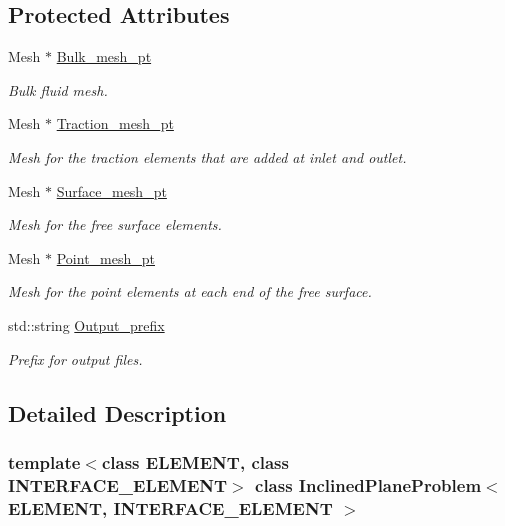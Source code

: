 \subsection*{Protected Attributes}
\begin{DoxyCompactItemize}
\item 
Mesh $\ast$ \hyperlink{classInclinedPlaneProblem_a20c506fe684dc146424b8ec019239783}{Bulk\+\_\+mesh\+\_\+pt}
\begin{DoxyCompactList}\small\item\em Bulk fluid mesh. \end{DoxyCompactList}\item 
Mesh $\ast$ \hyperlink{classInclinedPlaneProblem_a85bcc36a8ad4ad7aa3595585e73a3197}{Traction\+\_\+mesh\+\_\+pt}
\begin{DoxyCompactList}\small\item\em Mesh for the traction elements that are added at inlet and outlet. \end{DoxyCompactList}\item 
Mesh $\ast$ \hyperlink{classInclinedPlaneProblem_aba36d367278218bf00356c3bee0733a0}{Surface\+\_\+mesh\+\_\+pt}
\begin{DoxyCompactList}\small\item\em Mesh for the free surface elements. \end{DoxyCompactList}\item 
Mesh $\ast$ \hyperlink{classInclinedPlaneProblem_adefbac5880323d7de622e2ba0c526746}{Point\+\_\+mesh\+\_\+pt}
\begin{DoxyCompactList}\small\item\em Mesh for the point elements at each end of the free surface. \end{DoxyCompactList}\item 
std\+::string \hyperlink{classInclinedPlaneProblem_a6ad45c76bd24f63c0162313042ce2e7d}{Output\+\_\+prefix}
\begin{DoxyCompactList}\small\item\em Prefix for output files. \end{DoxyCompactList}\end{DoxyCompactItemize}


\subsection{Detailed Description}
\subsubsection*{template$<$class E\+L\+E\+M\+E\+NT, class I\+N\+T\+E\+R\+F\+A\+C\+E\+\_\+\+E\+L\+E\+M\+E\+NT$>$\newline
class Inclined\+Plane\+Problem$<$ E\+L\+E\+M\+E\+N\+T, I\+N\+T\+E\+R\+F\+A\+C\+E\+\_\+\+E\+L\+E\+M\+E\+N\+T $>$}

